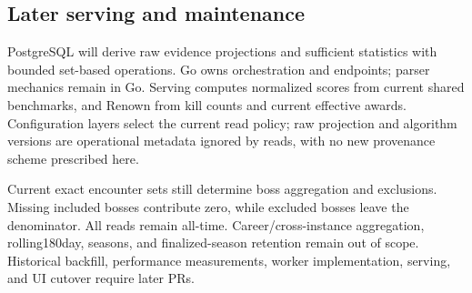 \documentclass[11pt]{article}
\begin{document}
\subsection{Later serving and maintenance}
PostgreSQL will derive raw evidence projections and sufficient statistics with bounded set-based operations. Go owns orchestration and endpoints; parser mechanics remain in Go. Serving computes normalized scores from current shared benchmarks, and Renown from kill counts and current effective awards. Configuration layers select the current read policy; raw projection and algorithm versions are operational metadata ignored by reads, with no new provenance scheme prescribed here.

Current exact encounter sets still determine boss aggregation and exclusions. Missing included bosses contribute zero, while excluded bosses leave the denominator. All reads remain all-time. Career/cross-instance aggregation, rolling180day, seasons, and finalized-season retention remain out of scope. Historical backfill, performance measurements, worker implementation, serving, and UI cutover require later PRs.
\end{document}
